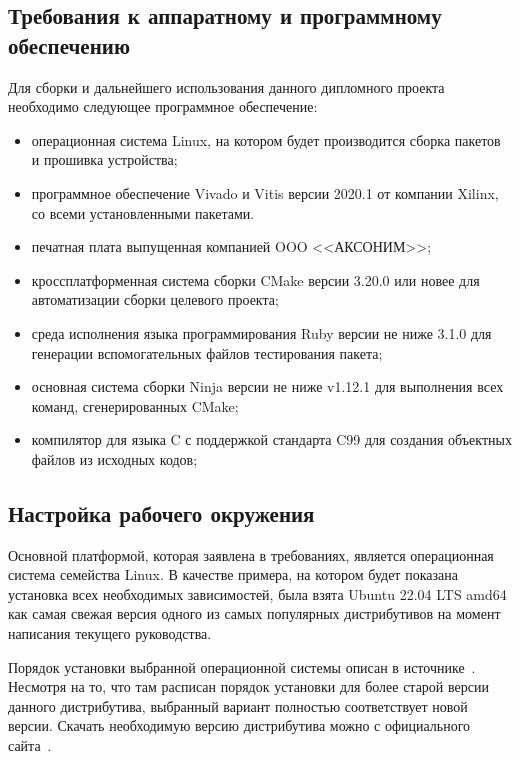 
\subsection{Требования к аппаратному и программному обеспечению}

Для сборки и дальнейшего использования данного дипломного проекта необходимо
следующее программное обеспечение:
\begin{itemize}
    \item операционная система Linux, на котором будет производится сборка пакетов и прошивка устройства;
    \item программное обеспечение Vivado и Vitis версии 2020.1 от компании Xilinx, со всеми установленными пакетами.
    \item печатная плата выпущенная компанией OOO <<АКСОНИМ>>;
    \item кроссплатформенная система сборки CMake версии 3.20.0 или новее
    для автоматизации сборки целевого проекта;
    \item среда исполнения языка программирования Ruby версии не ниже 3.1.0
    для генерации вспомогательных файлов тестирования пакета;
    \item основная система сборки Ninja версии не ниже v1.12.1 для выполнения всех команд,
    сгенерированных CMake;
    \item компилятор для языка C с поддержкой стандарта C99 для создания объектных
    файлов из исходных кодов;
\end{itemize}


\subsection{Настройка рабочего окружения}

Основной платформой, которая заявлена в требованиях,
является операционная система семейства Linux.
В качестве примера, на котором будет показана установка всех необходимых
зависимостей, была взята Ubuntu 22.04 LTS amd64 как самая свежая версия одного из самых популярных дистрибутивов на момент написания текущего руководства.


Порядок установки выбранной операционной системы описан в
источнике~\cite{ubuntu_how_to_install}. Несмотря на то, что там расписан порядок
установки для более старой версии данного дистрибутива, выбранный вариант
полностью соответствует новой версии.
Скачать необходимую версию дистрибутива можно с официального
сайта~\cite{ubuntu_download_site}.

